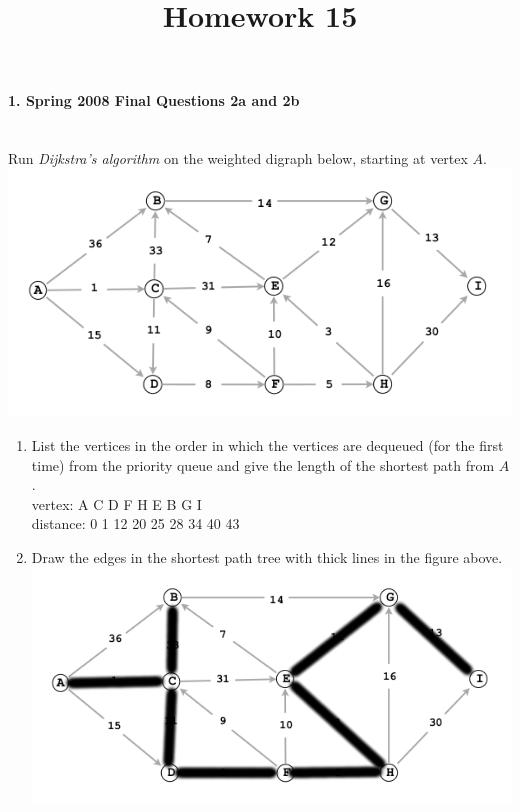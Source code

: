 \documentclass{article}
\begin{document}
\title{Homework 15}
\date{}
\maketitle


\paragraph{\Large 1. Spring 2008 Final Questions 2a and 2b}\mbox{}\\
Run \textit{Dijkstra’s algorithm} on the weighted digraph below, starting at vertex $A$.\\
\includegraphics[]{fin-f09-4.png}\\
\begin{enumerate}
\renewcommand{\theenumi}{\Alph{enumi}}
	\item List the vertices in the order in which the vertices are dequeued (for the first time) from the priority queue and give the length of the shortest path from $A$.\\
	
	vertex: A C D F H E B G I\\

	distance: 0 1 12 20 25 28 34 40 43

	\item Draw the edges in the shortest path tree with thick lines in the figure above.\\

	\includegraphics[]{fin-f09-4b.png}

\end{enumerate}
\end{document}
